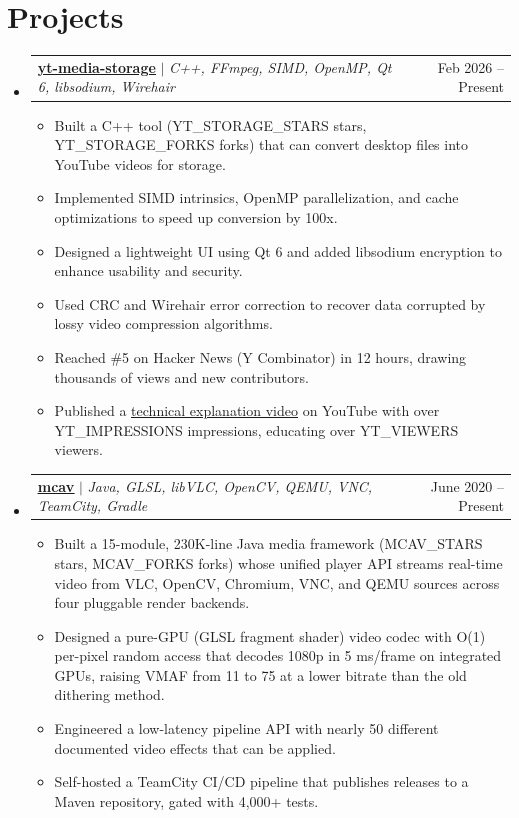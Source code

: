 \documentclass[letterpaper,11pt]{article}
\makeatletter
\let\oldhref\href
\renewcommand{\href}[2]{\oldhref{#1}{\uline{#2}}}
\newcommand{\resumeItem}[1]{
    \item\small{
            {#1 \vspace{-2pt}}
    }
}
\newcommand{\resumeProjectHeading}[2]{
    \item
    \begin{tabular*}{0.97\textwidth}{l@{\extracolsep{\fill}}r}
    \small#1 & #2 \\
    \end{tabular*}\vspace{-7pt}
}
\newcommand{\resumeSubHeadingListStart}{\begin{itemize}[leftmargin=0.15in, label={}]}
\newcommand{\resumeSubHeadingListEnd}{\end{itemize}}
\newcommand{\resumeItemListStart}{\begin{itemize}}
\newcommand{\resumeItemListEnd}{\end{itemize}\vspace{-5pt}}
\makeatother
\begin{document}
    \section{Projects}
    \resumeSubHeadingListStart
    \resumeProjectHeading
    {\href{https://github.com/PulseBeat02/yt-media-storage}{\textbf{yt-media-storage}} $|$ \emph{C++, FFmpeg, SIMD, OpenMP, Qt 6, libsodium, Wirehair}}{Feb 2026 -- Present}
    \resumeItemListStart
    \resumeItem{Built a C++ tool ({{YT_STORAGE_STARS}} stars, {{YT_STORAGE_FORKS}} forks) that can convert desktop files into YouTube videos for storage.}
    \resumeItem{Implemented SIMD intrinsics, OpenMP parallelization, and cache optimizations to speed up conversion by 100x.}
    \resumeItem{Designed a lightweight UI using Qt 6 and added libsodium encryption to enhance usability and security.}
    \resumeItem{Used CRC and Wirehair error correction to recover data corrupted by lossy video compression algorithms.}
    \resumeItem{Reached \#5 on Hacker News (Y Combinator) in 12 hours, drawing thousands of views and new contributors.}
    \resumeItem{Published a \href{https://www.youtube.com/watch?v=l03Os5uwWmk}{technical explanation video} on YouTube with over {{YT_IMPRESSIONS}} impressions, educating over {{YT_VIEWERS}} viewers.}
    \resumeItemListEnd
    \vspace{1mm}
    \resumeProjectHeading
    {\href{https://github.com/PulseBeat02/mcav}{\textbf{mcav}} $|$ \emph{Java, GLSL, libVLC, OpenCV, QEMU, VNC, TeamCity, Gradle}}{June 2020 -- Present}
    \resumeItemListStart
    \resumeItem{Built a 15-module, 230K-line Java media framework ({{MCAV_STARS}} stars, {{MCAV_FORKS}} forks) whose unified player API streams real-time video from VLC, OpenCV, Chromium, VNC, and QEMU sources across four pluggable render backends.}
    \resumeItem{Designed a pure-GPU (GLSL fragment shader) video codec with O(1) per-pixel random access that decodes 1080p in 5 ms/frame on integrated GPUs, raising VMAF from 11 to 75 at a lower bitrate than the old dithering method.}
    \resumeItem{Engineered a low-latency pipeline API with nearly 50 different documented video effects that can be applied.}
    \resumeItem{Self-hosted a TeamCity CI/CD pipeline that publishes releases to a Maven repository, gated with 4,000+ tests.}
    \resumeItemListEnd
    \resumeSubHeadingListEnd


\end{document}
